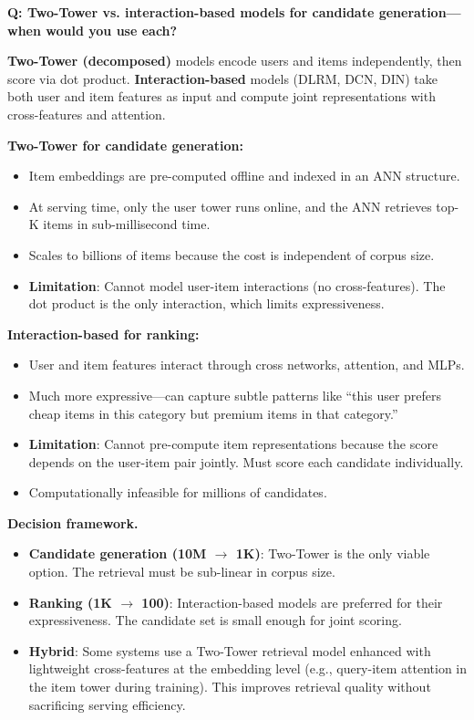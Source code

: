 
\begin{interviewq}
\textbf{Q: Two-Tower vs. interaction-based models for candidate generation---when would you use each?}

 \quad {} \quad \badgefreq{\freqhigh}

\stronganswer

\textbf{Two-Tower (decomposed)} models encode users and items independently, then score via dot product. \textbf{Interaction-based} models (DLRM, DCN, DIN) take both user and item features as input and compute joint representations with cross-features and attention.

\textbf{Two-Tower for candidate generation:}
\begin{itemize}
    \item Item embeddings are pre-computed offline and indexed in an ANN structure.
    \item At serving time, only the user tower runs online, and the ANN retrieves top-K items in sub-millisecond time.
    \item Scales to billions of items because the cost is independent of corpus size.
    \item \textbf{Limitation}: Cannot model user-item interactions (no cross-features). The dot product is the only interaction, which limits expressiveness.
\end{itemize}

\textbf{Interaction-based for ranking:}
\begin{itemize}
    \item User and item features interact through cross networks, attention, and MLPs.
    \item Much more expressive---can capture subtle patterns like ``this user prefers cheap items in this category but premium items in that category.''
    \item \textbf{Limitation}: Cannot pre-compute item representations because the score depends on the user-item pair jointly. Must score each candidate individually.
    \item Computationally infeasible for millions of candidates.
\end{itemize}

\textbf{Decision framework.}
\begin{itemize}
    \item \textbf{Candidate generation (10M $\rightarrow$ 1K)}: Two-Tower is the only viable option. The retrieval must be sub-linear in corpus size.
    \item \textbf{Ranking (1K $\rightarrow$ 100)}: Interaction-based models are preferred for their expressiveness. The candidate set is small enough for joint scoring.
    \item \textbf{Hybrid}: Some systems use a Two-Tower retrieval model enhanced with lightweight cross-features at the embedding level (e.g., query-item attention in the item tower during training). This improves retrieval quality without sacrificing serving efficiency.
\end{itemize}


\end{interviewq}
